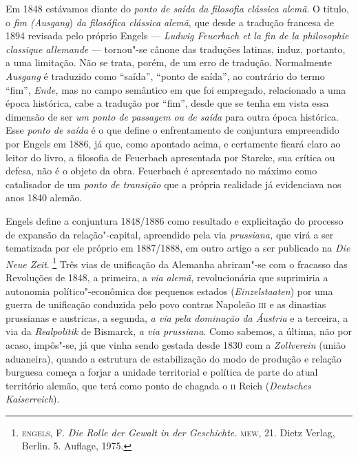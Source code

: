 Em 1848 estávamos diante do \emph{ponto de saída da filosofia clássica
alemã}. O titulo, o \emph{fim (Ausgang}) \emph{da filosófica clássica
alemã}, que desde a tradução francesa de 1894 revisada pelo próprio
Engels --- \emph{Ludwig Feuerbach et la fin de la philosophie classique
allemande} --- tornou"-se cânone das traduções latinas, induz, portanto,
a uma limitação. Não se trata, porém, de um erro de tradução.
Normalmente \emph{Ausgang} é traduzido como ``saída'', ``ponto de
saída'', ao contrário do termo ``fim'', \emph{Ende,} mas no campo
semântico em que foi empregado, relacionado a uma época histórica, cabe
a tradução por ``fim'', desde que se tenha em vista essa dimensão de ser
\emph{um ponto de passagem ou de saída} para outra época histórica. Esse
\emph{ponto de saída} é o que define o enfrentamento de conjuntura
empreendido por Engels em 1886, já que, como apontado acima, e
certamente ficará claro ao leitor do livro, a filosofia de Feuerbach
apresentada por Starcke, sua crítica ou defesa, não é o objeto da obra.
Feuerbach é apresentado no máximo como catalisador de um \emph{ponto de
transição} que a própria realidade já evidenciava nos anos 1840 alemão.

Engels define a conjuntura 1848/1886 como resultado e explicitação do
processo de expansão da relação"-capital, apreendido pela via
\emph{prussiana,} que virá a ser tematizada por ele próprio em
1887/1888, em outro artigo a ser publicado na \emph{Die Neue Zeit}.
\footnote{\textsc{engels}, F. \emph{Die Rolle der Gewalt in der
  Geschichte.} \textsc{mew}, 21. Dietz Verlag, Berlin. 5. Auflage, 1975.}
Três vias de unificação da Alemanha abriram"-se com o fracasso das
Revoluções de 1848, a primeira, a \emph{via alemã}, revolucionária que
suprimiria a autonomia político"-econômica dos pequenos estados
(\emph{Einzelstaaten}) por uma guerra de unificação conduzida pelo povo
contras Napoleão \textsc{iii} e as dinastias prussianas e austricas, a
segunda, \emph{a via pela dominação da Áustria} e a terceira, a via da
\emph{Realpolitik} de Bismarck, \emph{a via prussiana}. Como sabemos, a
última, não por acaso, impôs"-se, já que vinha sendo gestada desde 1830
com a \emph{Zollverein} (união aduaneira), quando a estrutura de
estabilização do modo de produção e relação burguesa começa a forjar a
unidade territorial e política de parte do atual território alemão, que
terá como ponto de chagada o \textsc{ii} Reich (\emph{Deutsches
Kaiserreich}).

